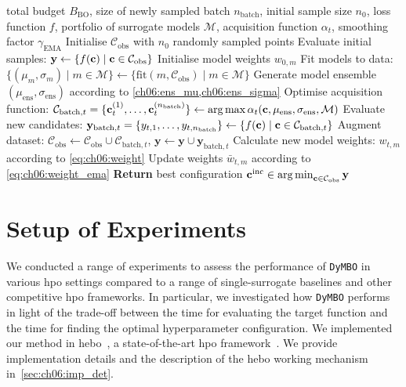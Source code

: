 \begin{algorithm}
  \caption{\texttt{DyMBO:} Dynamic Complementary Surrogate Models in \gls{bo}}

  \begin{algorithmic}[1]
         total budget $B_{\mathrm{BO}}$, size of newly sampled batch $n_{\mathrm{batch}}$, initial sample size $n_0$, loss function $f$, portfolio of surrogate models $\mathcal M$, acquisition function $\alpha_t$, smoothing factor $\gamma_{\mathrm{EMA}}$
        \STATE Initialise $\mathcal C_{\mathrm{obs}}$ with $n_0$ randomly sampled points
        \STATE Evaluate initial samples: $\mathbf y \gets \{f(\mathbf{c}) \mid \mathbf{c}\in \mathcal C_{\mathrm{obs}}\}$
        \STATE Initialise model weights $w_{0,m}$
            \STATE Fit models to data: $\{(\mu_{m},\sigma_{m}) \mid m \in \mathcal M\}\gets \{\text{fit}(m, \mathcal C_{\mathrm{obs}}) \mid m\in \mathcal M\}$
            \STATE Generate model ensemble $(\mu_\text{ens},\sigma_\text{ens})$ according to \cref{ch06:ens_mu,ch06:ens_sigma}
            \STATE Optimise acquisition function: $\mathcal C_{\mathrm{batch},t} = \{\mathbf{c}_{t}^{(1)},\ldots,\mathbf{c}_t^{(n_{\mathrm{batch}})}\}\gets \operatorname*{arg\,max} \alpha_t(\mathbf{c},\mu_\text{ens},\sigma_\text{ens},\mathcal M)$
            \STATE Evaluate new candidates: $\mathbf y_{\mathrm{batch},t} = \{y_{t,1},\ldots,y_{t,n_{\mathrm{batch}}}\} \gets \{f(\mathbf{c}) \mid \mathbf{c}\in \mathcal C_{\mathrm{batch},t}\}$
            \STATE Augment dataset: $\mathcal C_{\mathrm{obs}} \gets \mathcal C_{\mathrm{obs}} \cup \mathcal C_{\mathrm{batch},t}$, $\mathbf y \gets \mathbf y \cup \mathbf y_{\mathrm{batch},t}$
            \STATE Calculate new model weights: ${w}_{t,m}$ according to \cref{eq:ch06:weight}
            \STATE Update weights $\bar{w}_{t,m}$ according to \cref{eq:ch06:weight_ema}
        \ENDWHILE
        \STATE \textbf{Return} best configuration $\mathbf{c}^{\mathrm{inc}} \in \operatorname*{arg\,min}_{\mathbf{c} \in \mathcal C_{\mathrm{obs}}} \mathbf y$
  \end{algorithmic}
  \label{alg:ch06:debo}
\end{algorithm}

\section{Setup of Experiments}
\label{sec:ch06:experiments}

We conducted a range of experiments to assess the performance of \texttt{DyMBO} in various \gls{hpo} settings compared to a range of single-surrogate baselines and other competitive \gls{hpo} frameworks.
In particular, we investigated how \texttt{DyMBO} performs in light of the trade-off between the time for evaluating the target function and the time for finding the optimal hyperparameter configuration.
We implemented our method in \gls{hebo}~\citep{CowEtAl22}, a state-of-the-art \gls{hpo} framework~\citep{EggEtAl21}.
We provide implementation details and the description of the \gls{hebo} working mechanism in~\cref{sec:ch06:imp_det}.

